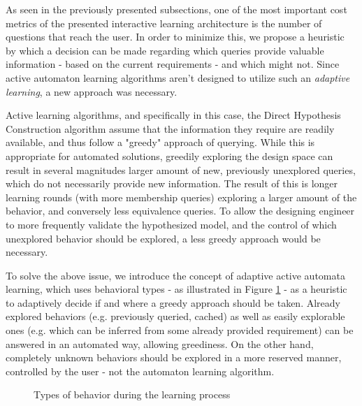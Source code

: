 As seen in the previously presented subsections, one of the most important cost metrics of the presented interactive learning architecture is the number of questions that reach the user. In order to minimize this, we propose a heuristic by which a decision can be made regarding which queries provide valuable information - based on the current requirements - and which might not. Since active automaton learning algorithms aren't designed to utilize such an \textit{adaptive learning}, a new approach was necessary. 

Active learning algorithms, and specifically in this case, the Direct Hypothesis Construction algorithm assume that the information they require are readily available, and thus follow a "greedy" approach of querying. While this is appropriate for automated solutions, greedily exploring the design space can result in several magnitudes larger amount of new, previously unexplored queries, which do not necessarily provide new information. The result of this is longer learning rounds (with more membership queries) exploring a larger amount of the behavior, and conversely less equivalence queries. To allow the designing engineer to more frequently validate the hypothesized model, and the control of which unexplored behavior should be explored, a less greedy approach would be necessary.

To solve the above issue, we introduce the concept of adaptive active automata learning, which uses behavioral types - as illustrated in Figure \ref{fig_architcture_commandhandling} - as a heuristic to adaptively decide if and where a greedy approach should be taken. Already explored behaviors (e.g. previously queried, cached) as well as easily explorable ones (e.g. which can be inferred from some already provided requirement)  can be answered in an automated way, allowing greediness. On the other hand, completely unknown behaviors should be explored in a more reserved manner, controlled by the user - not the automaton learning algorithm.

\begin{figure}[!ht] 
	\centering
	\caption{Types of behavior during the learning process} 
	\label{fig_architcture_commandhandling}
\end{figure} %
